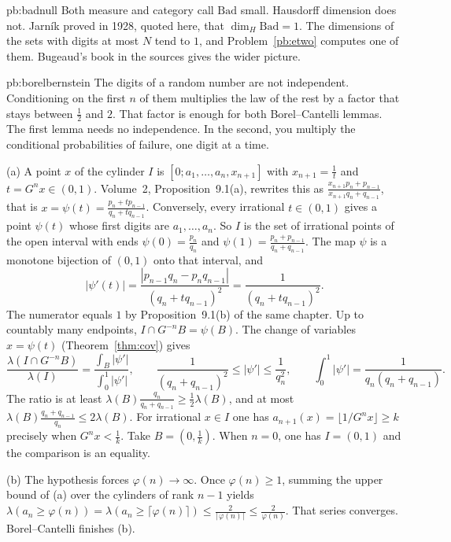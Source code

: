 \begin{solution}{pb:badnull}
\leads Both measure and category call $\mathrm{Bad}$ small. Hausdorff dimension does not. Jarník proved in 1928, quoted here, that $\dim_H\mathrm{Bad}=1$. The dimensions of the sets with digits at most $N$ tend to $1$, and Problem~\ref{pb:etwo} computes one of them. Bugeaud's book in the sources gives the wider picture.
\end{solution}

\begin{solution}{pb:borelbernstein}
\idea The digits of a random number are not independent. Conditioning on the first $n$ of them multiplies the law of the rest by a factor that stays between $\frac12$ and $2$. That factor is enough for both Borel--Cantelli lemmas. The first lemma needs no independence. In the second, you multiply the conditional probabilities of failure, one digit at a time.

\writeup (a) A point $x$ of the cylinder $I$ is $[0;a_1,\dots,a_n,x_{n+1}]$ with $x_{n+1}=\frac1t$ and $t=G^nx\in(0,1)$. Volume~2, Proposition~9.1(a), rewrites this as $\frac{x_{n+1}p_n+p_{n-1}}{x_{n+1}q_n+q_{n-1}}$, that is $x=\psi(t)=\frac{p_n+tp_{n-1}}{q_n+tq_{n-1}}$. Conversely, every irrational $t\in(0,1)$ gives a point $\psi(t)$ whose first digits are $a_1,\dots,a_n$. So $I$ is the set of irrational points of the open interval with ends $\psi(0)=\frac{p_n}{q_n}$ and $\psi(1)=\frac{p_n+p_{n-1}}{q_n+q_{n-1}}$. The map $\psi$ is a monotone bijection of $(0,1)$ onto that interval, and
\[
|\psi'(t)|=\frac{|p_{n-1}q_n-p_nq_{n-1}|}{(q_n+tq_{n-1})^2}=\frac1{(q_n+tq_{n-1})^2}.
\]
The numerator equals $1$ by Proposition~9.1(b) of the same chapter. Up to countably many endpoints, $I\cap G^{-n}B=\psi(B)$. The change of variables $x=\psi(t)$ (Theorem~\ref{thm:cov}) gives
\[
\frac{\lambda(I\cap G^{-n}B)}{\lambda(I)}=\frac{\int_B|\psi'|}{\int_0^1|\psi'|},\qquad\frac1{(q_n+q_{n-1})^2}\le|\psi'|\le\frac1{q_n^2},\qquad\int_0^1|\psi'|=\frac1{q_n(q_n+q_{n-1})}.
\]
The ratio is at least $\lambda(B)\frac{q_n}{q_n+q_{n-1}}\ge\frac12\lambda(B)$, and at most $\lambda(B)\frac{q_n+q_{n-1}}{q_n}\le 2\lambda(B)$. For irrational $x\in I$ one has $a_{n+1}(x)=\lfloor 1/G^nx\rfloor\ge k$ precisely when $G^nx<\frac1k$. Take $B=(0,\frac1k)$. When $n=0$, one has $I=(0,1)$ and the comparison is an equality.

(b) The hypothesis forces $\varphi(n)\to\infty$. Once $\varphi(n)\ge 1$, summing the upper bound of (a) over the cylinders of rank $n-1$ yields $\lambda(a_n\ge\varphi(n))=\lambda(a_n\ge\lceil\varphi(n)\rceil)\le\frac2{\lceil\varphi(n)\rceil}\le\frac2{\varphi(n)}$. That series converges. Borel--Cantelli finishes (b).


\end{solution}
